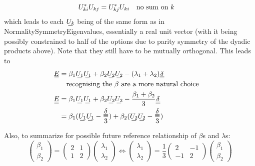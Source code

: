 \documentclass[11pt]{article}
\begin{document}
\begin{equation}
    U_{ki}^*U_{kj} = U_{kj}^*U_{ki} \qq{no sum on $k$}
\end{equation}
which leads to each $\su{U_k}$ being of the same form as in NormalitySymmetryEigenvalues, essentially a real unit vector (with it being possibly constrained to half of the options due to parity symmetry of the dyadic products above).
Note that they still have to be mutually orthogonal.
This leads to
\begin{align}
    \du{E} &= \beta_1 \su{U_1}\su{U_1} + \beta_2 \su{U_2}\su{U_2} - (\lambda_1+\lambda_2)\du{\delta} \\
    &\qq{recognising the $\beta$ are a more natural choice} \\
    \du{E} &= \beta_1 \su{U_1}\su{U_1} + \beta_2 \su{U_2}\su{U_2} - \frac{\beta_1 + \beta_2}{3}\du{\delta} \\
    &= \beta_1 (\su{U_1}\su{U_1} - \frac{\du{\delta}}{3}) + \beta_2 (\su{U_2}\su{U_2} - \frac{\du{\delta}}{3}) \label{eq:biaxialraw}
\end{align}

Also, to summarize for possible future reference relationship of $\beta$s and $\lambda$s:
\begin{equation}
    \begin{pmatrix} \beta_1 \\ \beta_2 \end{pmatrix} = \begin{pmatrix} 2 & 1 \\ 1 & 2 \end{pmatrix} \begin{pmatrix} \lambda_1 \\ \lambda_2 \end{pmatrix} \Leftrightarrow \begin{pmatrix} \lambda_1 \\ \lambda_2 \end{pmatrix} = \frac{1}{3}\begin{pmatrix} 2 & -1 \\ -1 & 2 \end{pmatrix} \begin{pmatrix} \beta_1 \\ \beta_2 \end{pmatrix} \label{eq:betalambda}
\end{equation}

\pagebreak
{}
\end{document}
